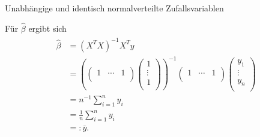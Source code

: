 \documentclass[
  8pt,
  ignorenonframetext,
]{beamer}
\begin{document}
\begin{frame}{Unabhängige und identisch normalverteilte
Zufallsvariablen}
\protect\hypertarget{unabhuxe4ngige-und-identisch-normalverteilte-zufallsvariablen-1}{}
\footnotesize

Für \(\hat{\beta}\) ergibt sich \begin{align*}
\begin{split}
\hat{\beta}
& = (X^TX)^{-1}X^T y
\\
& =
\left(
\begin{pmatrix}
1 & \cdots & 1\\
\end{pmatrix}
\begin{pmatrix}
1\\
\vdots \\
1\\
\end{pmatrix}
\right)^{-1}
\begin{pmatrix}
1 & \cdots & 1\\
\end{pmatrix}
\begin{pmatrix}
y_{1}\\
\vdots \\
y_{n}\\
\end{pmatrix}
\\
& = n^{-1}\sum_{i=1}^n y_i
\\
& =\frac{1}{n}\sum_{i=1}^n y_i
\\
& =: \bar{y}.
\end{split}
\end{align*}
\end{frame}
\end{document}
